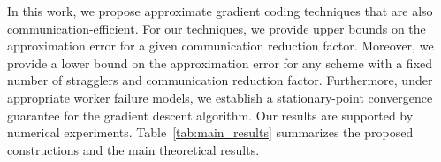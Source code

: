 \documentclass[journal,draftcls,onecolumn]{IEEEtran}
\theoremstyle{mystyle}
\begin{document}







In this work, we propose approximate gradient coding techniques that are also communication-efficient. For our techniques, we provide upper bounds on the approximation error for a given communication reduction factor. Moreover, we provide a lower bound on the approximation error for any scheme with a fixed number of stragglers and communication reduction factor. Furthermore, under appropriate worker failure models, we establish a stationary-point convergence guarantee for the gradient descent algorithm. Our results are supported by numerical experiments. Table~\ref{tab:main_results} summarizes the proposed constructions and the main theoretical results.
\end{document}
